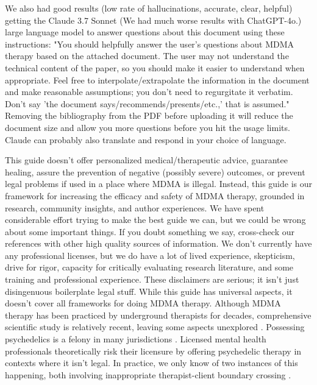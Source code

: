 \documentclass[12pt,letterpaper]{book}
\begin{document}
We also had good results (low rate of hallucinations, accurate, clear, helpful) getting the Claude 3.7 Sonnet (We had much worse results with ChatGPT-4o.) large language model to answer questions about this document using these instructions: "You should helpfully answer the user's questions about MDMA therapy based on the attached document. The user may not understand the technical content of the paper, so you should make it easier to understand when appropriate. Feel free to interpolate/extrapolate the information in the document and make reasonable assumptions; you don't need to regurgitate it verbatim. Don't say 'the document says/recommends/presents/etc.,' that is assumed." Removing the bibliography from the PDF before uploading it will reduce the document size and allow you more questions before you hit the usage limits. Claude can probably also translate and respond in your choice of language.

This guide doesn't offer personalized medical/therapeutic advice, guarantee healing, assure the prevention of negative (possibly severe) outcomes, or prevent legal problems if used in a place where MDMA is illegal. Instead, this guide is our framework for increasing the efficacy and safety of MDMA therapy, grounded in research, community insights, and author experiences. We have spent considerable effort trying to make the best guide we can, but we could be wrong about some important things. If you doubt something we say, cross-check our references with other high quality sources of information. We don't currently have any professional licenses, but we do have a lot of lived experience, skepticism, drive for rigor, capacity for critically evaluating research literature, and some training and professional experience. These disclaimers are serious; it isn't just disingenuous boilerplate legal stuff. While this guide has universal aspects, it doesn't cover all frameworks for doing MDMA therapy. Although MDMA therapy has been practiced by underground therapists for decades, comprehensive scientific study is relatively recent, leaving some aspects unexplored \cite{passieHistory}. Possessing psychedelics is a felony in many jurisdictions \cite{alphaLegalization}. Licensed mental health professionals theoretically risk their licensure by offering psychedelic therapy in contexts where it isn't legal. In practice, we only know of two instances of this happening, both involving inappropriate therapist-client boundary crossing \cite{sessa2015underground,lindsayLicense}.
\end{document}
